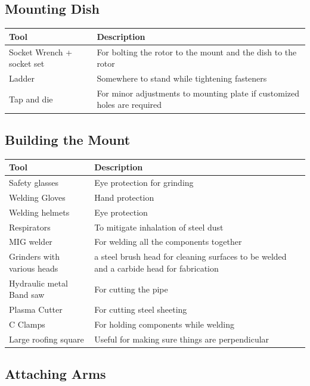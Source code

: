 \documentclass[11pt]{article} %
\begin{document}
\subsection{Mounting Dish}

\begin{tabular}{| l | p{10cm} |}
\hline
\textbf{Tool} & \textbf{Description} \\ \hline \hline
Socket Wrench + socket set & For bolting the rotor to the mount and the dish to the rotor \\ \hline
Ladder & Somewhere to stand while tightening fasteners \\ \hline
Tap and die & For minor adjustments to mounting plate if customized holes are required \\ \hline
\end{tabular}


\subsection{Building the Mount}

\begin{tabular}{| l | p{10cm} |}
\hline
\textbf{Tool} & \textbf{Description} \\ \hline \hline
Safety glasses & Eye protection for grinding \\ \hline
Welding Gloves & Hand protection \\ \hline
Welding helmets & Eye protection \\ \hline
Respirators & To mitigate inhalation of steel dust \\ \hline
MIG welder & For welding all the components together \\ \hline
Grinders with various heads & a steel brush head for cleaning surfaces to be welded and a carbide head for fabrication \\ \hline
Hydraulic metal Band saw & For cutting the pipe \\ \hline
Plasma Cutter & For cutting steel sheeting \\ \hline
C Clamps & For holding components while welding \\ \hline
Large roofing square & Useful for making sure things are perpendicular \\ \hline
\end{tabular}


\subsection{Attaching Arms}
\end{document}

